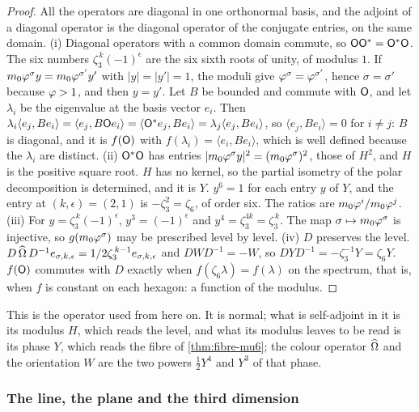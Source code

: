 \begin{proof}
All the operators are diagonal in one orthonormal basis, and the adjoint of a diagonal operator is the diagonal
operator of the conjugate entries, on the same domain.
(i) Diagonal operators with a common domain commute, so $\mathsf{O}\mathsf{O}^{*}=\mathsf{O}^{*}\mathsf{O}$.  The six numbers
$\zeta_3^{\,k}(-1)^{\epsilon}$ are the six sixth roots of unity, of modulus $1$.  If
$m_0\varphi^{\sigma}y=m_0\varphi^{\sigma'}y'$ with $|y|=|y'|=1$, the moduli give $\varphi^{\sigma}=\varphi^{\sigma'}$,
hence $\sigma=\sigma'$ because $\varphi>1$, and then $y=y'$.  Let $B$ be bounded and commute with $\mathsf{O}$, and let
$\lambda_i$ be the eigenvalue at the basis vector $e_i$.  Then
$\lambda_i\langle e_j,Be_i\rangle=\langle e_j,B\mathsf{O} e_i\rangle=\langle\mathsf{O}^{*}e_j,Be_i\rangle
=\lambda_j\langle e_j,Be_i\rangle$, so $\langle e_j,Be_i\rangle=0$ for $i\ne j$: $B$ is diagonal, and it is
$f(\mathsf{O})$ with $f(\lambda_i)=\langle e_i,Be_i\rangle$, which is well defined because the $\lambda_i$ are distinct.
(ii) $\mathsf{O}^{*}\mathsf{O}$ has entries $|m_0\varphi^{\sigma}y|^2=(m_0\varphi^{\sigma})^2$, those of $H^2$, and $H$ is the
positive square root.  $H$ has no kernel, so the partial isometry of the polar decomposition is determined, and it
is $Y$.  $y^6=1$ for each entry $y$ of $Y$, and the entry at $(k,\epsilon)=(2,1)$ is $-\zeta_3^{2}=\zeta_6$, of
order six.  The ratios are $m_0\varphi^{i}/m_0\varphi^{j}$.
(iii) For $y=\zeta_3^{\,k}(-1)^{\epsilon}$, $y^3=(-1)^{\epsilon}$ and $y^4=\zeta_3^{4k}=\zeta_3^{\,k}$.  The map
$\sigma\mapsto m_0\varphi^{\sigma}$ is injective, so $g(m_0\varphi^{\sigma})$ may be prescribed level by level.
(iv) $D$ preserves the level.  $D\,\widehat{\Omega}\,D^{-1}e_{\sigma,k,\epsilon}=1/2\zeta_3^{\,k-1}e_{\sigma,k,\epsilon}$ and
$DWD^{-1}=-W$, so $DYD^{-1}=-\zeta_3^{-1}Y=\zeta_6Y$.  $f(\mathsf{O})$ commutes with $D$ exactly when
$f(\zeta_6\lambda)=f(\lambda)$ on the spectrum, that is, when $f$ is constant on each hexagon: a function of the
modulus.
\end{proof}

This is the operator used from here on.  It is normal; what is self-adjoint in it is its modulus $H$, which reads the
level, and what its modulus leaves to be read is its phase $Y$, which reads the fibre of \cref{thm:fibre-mu6}; the
colour operator $\widehat{\Omega}$ and the orientation $W$ are the two powers $\tfrac12Y^4$ and $Y^3$ of that phase.

\subsubsection{The line, the plane and the third dimension}\label{ssec:dimensional-chain}

